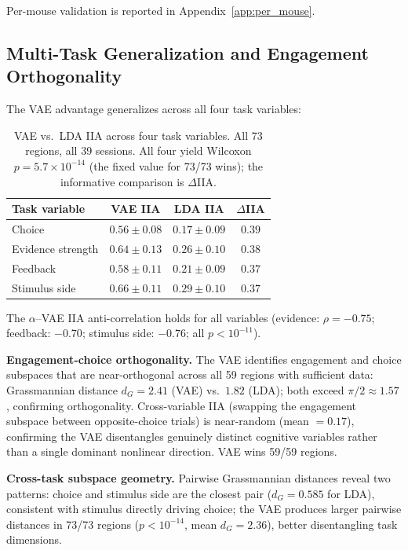 \documentclass{article}
\begin{document}
Per-mouse validation is reported in Appendix~\ref{app:per_mouse}.


\subsection{Multi-Task Generalization and Engagement Orthogonality}
\label{sec:generalization}

The VAE advantage generalizes across all four task variables:

\begin{table}[h]
\centering
\small
\caption{VAE vs.\ LDA IIA across four task variables. All 73 regions, all 39 sessions. All four yield Wilcoxon $p = 5.7 \times 10^{-14}$ (the fixed value for 73/73 wins); the informative comparison is $\Delta$IIA.}
\label{tab:multitask}
\begin{tabular}{lccc}
\toprule
Task variable & VAE IIA & LDA IIA & $\Delta$IIA \\
\midrule
Choice & $0.56 \pm 0.08$ & $0.17 \pm 0.09$ & $0.39$ \\
Evidence strength & $0.64 \pm 0.13$ & $0.26 \pm 0.10$ & $0.38$ \\
Feedback & $0.58 \pm 0.11$ & $0.21 \pm 0.09$ & $0.37$ \\
Stimulus side & $0.66 \pm 0.11$ & $0.29 \pm 0.10$ & $0.37$ \\
\bottomrule
\end{tabular}
\end{table}

The $\alpha$--VAE IIA anti-correlation holds for all variables (evidence: $\rho = -0.75$; feedback: $-0.70$; stimulus side: $-0.76$; all $p < 10^{-11}$).

\textbf{Engagement-choice orthogonality.} The VAE identifies engagement and choice subspaces that are near-orthogonal across all 59 regions with sufficient data: Grassmannian distance $d_G = 2.41$ (VAE) vs.\ $1.82$ (LDA); both exceed $\pi/2 \approx 1.57$, confirming orthogonality. Cross-variable IIA (swapping the engagement subspace between opposite-choice trials) is near-random (mean $= 0.17$), confirming the VAE disentangles genuinely distinct cognitive variables rather than a single dominant nonlinear direction. VAE wins 59/59 regions.

\textbf{Cross-task subspace geometry.} Pairwise Grassmannian distances reveal two patterns: choice and stimulus side are the closest pair ($d_G = 0.585$ for LDA), consistent with stimulus directly driving choice; the VAE produces larger pairwise distances in 73/73 regions ($p < 10^{-14}$, mean $d_G = 2.36$), better disentangling task dimensions.
\end{document}
